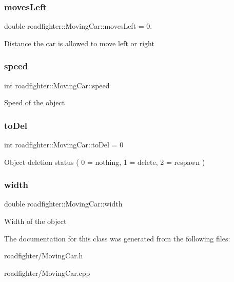 \subsubsection{\texorpdfstring{moves\+Left}{movesLeft}}
{\footnotesize\ttfamily double roadfighter\+::\+Moving\+Car\+::moves\+Left = 0.\hspace{0.3cm}{\ttfamily [protected]}}

Distance the car is allowed to move left or right \mbox{\label{classroadfighter_1_1MovingCar_aa11ffbdab47c7fdf1311cfe02f0d8bd7}} 
\subsubsection{\texorpdfstring{speed}{speed}}
{\footnotesize\ttfamily int roadfighter\+::\+Moving\+Car\+::speed\hspace{0.3cm}{\ttfamily [protected]}}

Speed of the object \mbox{\label{classroadfighter_1_1MovingCar_a326ee7c0301dd03d570d3820612614ca}} 
\subsubsection{\texorpdfstring{to\+Del}{toDel}}
{\footnotesize\ttfamily int roadfighter\+::\+Moving\+Car\+::to\+Del = 0\hspace{0.3cm}{\ttfamily [protected]}}

Object deletion status ( 0 = nothing, 1 = delete, 2 = respawn ) \mbox{\label{classroadfighter_1_1MovingCar_af13dfca7a365dd785dbfc2c8446232a9}} 
\subsubsection{\texorpdfstring{width}{width}}
{\footnotesize\ttfamily double roadfighter\+::\+Moving\+Car\+::width\hspace{0.3cm}{\ttfamily [protected]}}

Width of the object 

The documentation for this class was generated from the following files\+:\begin{DoxyCompactItemize}
\item 
roadfighter/Moving\+Car.\+h\item 
roadfighter/Moving\+Car.\+cpp\end{DoxyCompactItemize}
